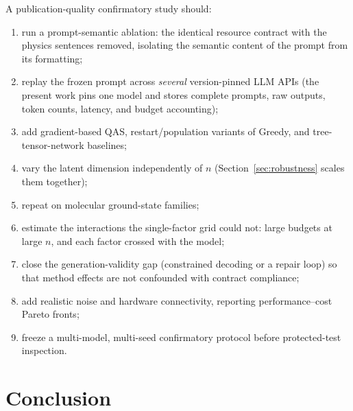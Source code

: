 \documentclass[11pt]{article}
\begin{document}
A publication-quality confirmatory study should:
\begin{enumerate}
\item run a prompt-semantic ablation: the identical resource contract with the physics sentences removed, isolating the semantic content of the prompt from its formatting;
\item replay the frozen prompt across \emph{several} version-pinned LLM APIs (the present work pins one model and stores complete prompts, raw outputs, token counts, latency, and budget accounting);
\item add gradient-based QAS, restart/population variants of Greedy, and tree-tensor-network baselines;
\item vary the latent dimension independently of $n$ (Section~\ref{sec:robustness} scales them together);
\item repeat on molecular ground-state families;
\item estimate the interactions the single-factor grid could not: large budgets at large $n$, and each factor crossed with the model;
\item close the generation-validity gap (constrained decoding or a repair loop) so that method effects are not confounded with contract compliance;
\item add realistic noise and hardware connectivity, reporting performance--cost Pareto fronts;
\item freeze a multi-model, multi-seed confirmatory protocol before protected-test inspection.
\end{enumerate}

\section{Conclusion}
\end{document}
